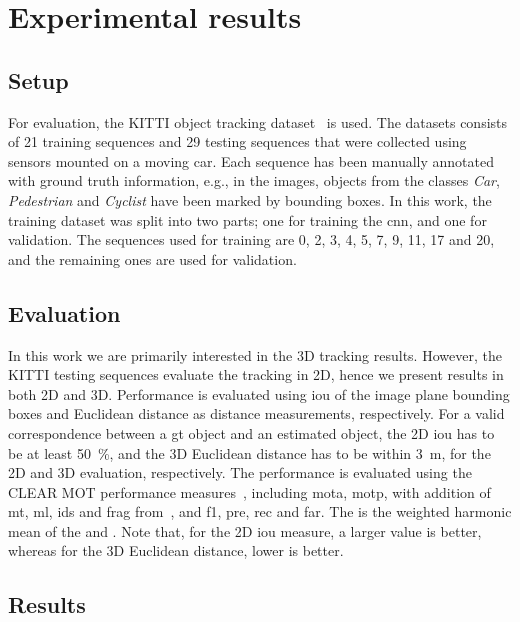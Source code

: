 \documentclass[conference]{IEEEtran}
\begin{document}
%
 
%
 
\section{Experimental results}
\label{sec:results}


\subsection{Setup}
For evaluation, the KITTI object tracking dataset~\cite{Geiger2012CVPR} is used.
The datasets consists of 21 training sequences and 29 testing sequences that were collected using sensors mounted on a moving car.
Each sequence has been manually annotated with ground truth information, e.g., in the images, objects from the classes \textit{Car}, \textit{Pedestrian} and \textit{Cyclist} have been marked by bounding boxes.
In this work, the training dataset was split into two parts; one for training the \gls{cnn}, and one for validation.
The sequences used for training are 0, 2, 3, 4, 5, 7, 9, 11, 17 and 20, and the remaining ones are used for validation.

\subsection{Evaluation}
In this work we are primarily interested in the 3D tracking results. However, the KITTI testing sequences evaluate the tracking in 2D, hence we present results in both 2D and 3D. Performance is evaluated using \gls{iou} of the image plane bounding boxes and Euclidean distance as distance measurements, respectively.
For a valid correspondence between a \gls{gt} object and an estimated object, the 2D \gls{iou} has to be at least \SI{50}{\percent}, and the 3D Euclidean distance has to be within \SI{3}{\meter}, for the 2D and 3D evaluation, respectively.
The performance is evaluated using the CLEAR MOT performance measures~\cite{Bernardin2008}, including \gls{mota}, \gls{motp}, with addition of \gls{mt}, \gls{ml}, \gls{ids} and \gls{frag} from~\cite{YuanLi2009}, and \gls{f1}, \gls{pre}, \gls{rec} and \gls{far}.
The  is the weighted harmonic mean of the  and .
Note that, for the 2D \gls{iou} measure, a larger value is better, whereas for the 3D Euclidean distance, lower is better.

\subsection{Results}
\end{document}
